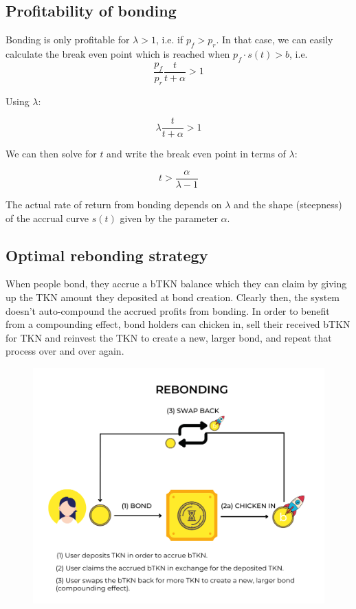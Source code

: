 \documentclass{article}
\begin{document}
\subsection{Profitability of bonding}
Bonding is only profitable for $\lambda>1$, i.e. if $p_f>p_r$. In that case, we can easily calculate the break even point which is reached when $p_f \cdot s(t)>b$, i.e.
\begin{equation}
  \label{eq:break_even_0}
\frac{p_f}{p_r}\frac{t}{t+\alpha} > 1
\end{equation}

Using $\lambda$:

\begin{equation}
  \label{eq:break_even_0}
\lambda\frac{t}{t+\alpha} > 1
\end{equation}

We can then solve for $t$ and write the break even point in terms of $\lambda$:

\begin{equation}
  \label{eq:break_even_2}
t > \frac{\alpha}{\lambda-1}
\end{equation}

The actual rate of return from bonding depends on $\lambda$ and the shape (steepness) of the accrual curve $s(t)$ given by the parameter $\alpha$.

\subsection{Optimal rebonding strategy}
  \label{sec:rebonding_strategy}
When people bond, they accrue a bTKN balance which they can claim by giving up the TKN amount they deposited at bond creation. Clearly then, the system doesn't auto-compound the accrued profits from bonding. In order to benefit from a compounding effect, bond holders can chicken in, sell their received bTKN for TKN and reinvest the TKN to create a new, larger bond, and repeat that process over and over again.

\begin{figure}[ht]
    \centering
    \includegraphics[width=0.5\linewidth]{./rebonding_text.png}
\end{figure}
\end{document}
